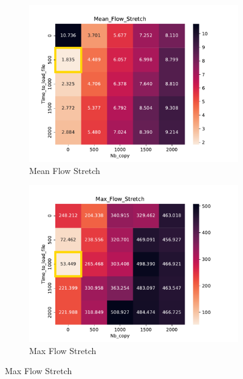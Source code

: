 \documentclass[a4paper]{article}
\begin{document}
\begin{figure}[H]\centering
\begin{subfigure}[b]{0.4\linewidth}\centering\includegraphics[width=1\linewidth]{MBSS/plot/Heatmap_Stretch_FCFS_Score_Time_to_load_file_Nb_copy_2022-01-24->2022-01-24_450_128_32_256_4_1024.pdf}\caption{Mean Flow Stretch}\end{subfigure}
\begin{subfigure}[b]{0.4\linewidth}\centering\includegraphics[width=1\linewidth]{MBSS/plot/Heatmap_Max_Stretch_FCFS_Score_Time_to_load_file_Nb_copy_2022-01-24->2022-01-24_450_128_32_256_4_1024.pdf}\caption{Max Flow Stretch}\end{subfigure}

\end{figure}
\end{document}
